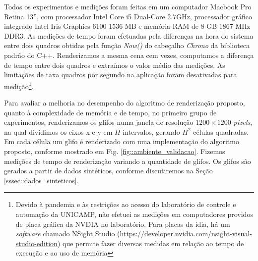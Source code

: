 
Todos os experimentos e medições foram feitas em um computador Macbook Pro Retina 13'', com processador Intel Core i5 Dual-Core 2.7GHz, processador gráfico integrado Intel Iris Graphics 6100 1536 MB e memória RAM de 8 GB 1867 MHz DDR3.
As medições de tempo foram efetuadas pela diferenças na hora do sistema entre dois quadros obtidas pela função \textit{Now()} do cabeçalho \textit{Chrono} da biblioteca padrão do C++. Renderizamos a mesma cena cem vezes, computamos a diferença de tempo entre dois quadros e extraímos o valor médio das medições. As limitações de taxa quadros por segundo na aplicação foram desativadas para medição\footnote{Devido à pandemia e às restrições ao acesso do laboratório de controle e automação da UNICAMP, não efetuei as medições em computadores providos de placa gráfica da NVDIA no laboratório. Para placas da idia, há um \textit{software} chamado NSight Studio (\url{https://developer.nvidia.com/nsight-visual-studio-edition}) que permite fazer diversas medidas em relação ao tempo de execução e ao uso de memória}.



Para avaliar a melhoria no desempenho do algoritmo de renderização proposto, quanto à complexidade de memória e de tempo, no primeiro grupo de experimentos, renderizamos os glifos numa janela de resolução $1200 \times 1200$ \textit{pixels}, na qual dividimos os eixos x e y em $H$ intervalos, gerando $H^2$ células quadradas. Em cada célula um glifo é renderizado com uma implementação do algoritmo proposto, conforme mostrado em Fig. \ref{fig::ambiente_validacao}. Fizemos medições de tempo de renderização variando a quantidade de glifos. Os glifos são gerados a partir de dados sintéticos, conforme discutiremos na Seção \ref{sssec::dados_sinteticos}. %

